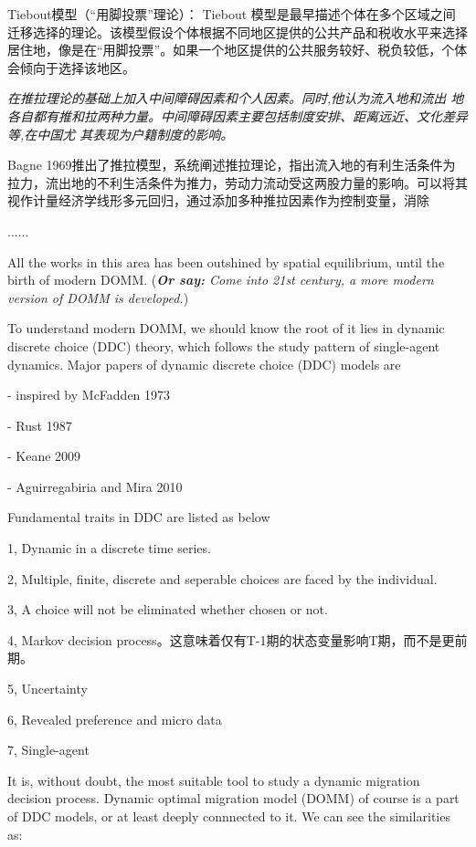 \documentclass[a4paper,12pt]{article}
\begin{document}
Tiebout模型（“用脚投票”理论）： Tiebout 模型是最早描述个体在多个区域之间迁移选择的理论。该模型假设个体根据不同地区提供的公共产品和税收水平来选择居住地，像是在“用脚投票”。如果一个地区提供的公共服务较好、税负较低，个体会倾向于选择该地区。

\cite{leeTheoryMigration1966}\textit{在推拉理论的基础上加入中间障碍因素和个人因素。同时,他认为流入地和流出  地各自都有推和拉两种力量。中间障碍因素主要包括制度安排、距离远近、文化差异等,在中国尤  其表现为户籍制度的影响。}

Bagne 1969推出了推拉模型，系统阐述推拉理论，指出流入地的有利生活条件为拉力，流出地的不利生活条件为推力，劳动力流动受这两股力量的影响。可以将其视作计量经济学线形多元回归，通过添加多种推拉因素作为控制变量，消除

......

All the works in this area has been outshined by spatial equilibrium, until the birth of modern DOMM.
(\textit{\textbf{Or say:} Come into 21st century, a more modern version of DOMM is developed.})

To understand modern DOMM, 
we should know the root of it lies in dynamic discrete choice (DDC) theory, which follows the study pattern of single-agent dynamics.
Major papers of dynamic discrete choice (DDC) models are 

- inspired by McFadden 1973

- Rust 1987

- Keane 2009

- Aguirregabiria and Mira 2010





Fundamental traits in DDC are listed as below 

1, Dynamic in a discrete time series.

2, Multiple, finite, discrete and seperable choices are faced by the individual.

3, A choice will not be eliminated whether chosen or not.

4, Markov decision process。这意味着仅有T-1期的状态变量影响T期，而不是更前期。

5, Uncertainty

6, Revealed preference and micro data

7, Single-agent





It is, without doubt, the most suitable tool to study a dynamic migration decision process. Dynamic optimal migration model (DOMM) of course is a part of DDC models, or at least deeply connnected to it. We can see the similarities as:
\end{document}
